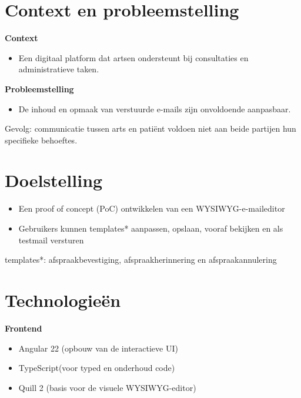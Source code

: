 
\section{Context en probleemstelling}%
\label{vst:context}

\textbf{Context}
\begin{itemize}
    \item Een digitaal platform dat artsen ondersteunt 
bij consultaties en administratieve taken. 
\end{itemize}

\textbf{Probleemstelling}
\begin{itemize}
    \item De inhoud en opmaak van verstuurde e-mails
zijn onvoldoende aanpasbaar. 
\end{itemize}
Gevolg: communicatie tussen arts en patiënt 
voldoen niet aan beide partijen hun specifieke behoeftes. 

\section{Doelstelling}%
\label{vst:doelstelling}
\begin{itemize}
    \item Een proof of concept (PoC) ontwikkelen van een WYSIWYG-e-maileditor
    \item Gebruikers kunnen templates* aanpassen, opslaan, vooraf bekijken en als testmail versturen 
\end{itemize}
templates*: afspraakbevestiging, afspraakherinnering en afspraakannulering
 
\newpage
\section{Technologieën}%
\label{vst:technologieen}
\textbf{Frontend}
\begin{itemize}
    \item Angular 22 (opbouw van de interactieve UI)
    \item TypeScript(voor typed en onderhoud code)
    \item Quill 2  (basis voor de visuele WYSIWYG-editor)
\end{itemize}

